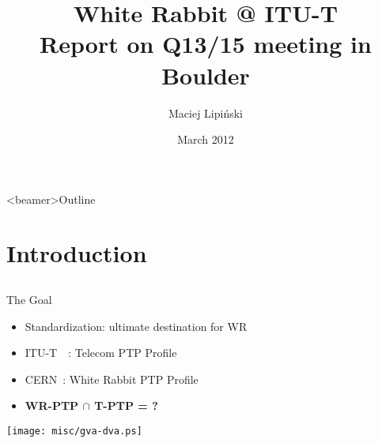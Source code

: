 \documentclass[compress,red]{beamer}
\title[ITU-T Q13/15 meeting report\hspace{2em}\insertframenumber/\inserttotalframenumber]
{White Rabbit @ ITU-T\\ Report on Q13/15 meeting in Boulder}
\institute{
   \begin{center}
    Hardware and Timing Section\\
    CERN
   \end{center}
}
\author{
Maciej Lipi\'{n}ski %
}
\date{March 2012}
\begin{document}
\frame{\titlepage}
\begin{frame}<beamer>{Outline}

    \tableofcontents %

\end{frame}
\section{Introduction}
\subsection{}
\begin{frame}{The Goal}
  
  \begin{itemize}
    \item Standardization: ultimate destination for WR
    \item ITU-T~~: Telecom PTP Profile 
    \item CERN~: White Rabbit PTP Profile 
    \item {\bf WR-PTP $\cap$ T-PTP = ?} 
  \end{itemize}

    \begin{center}
    \texttt{[image: misc/gva-dva.ps]}
    \end{center}


\end{frame}
\end{document}
